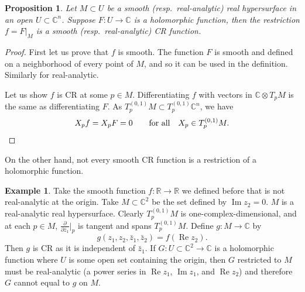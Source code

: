 \documentclass[12pt,openany]{book}
\renewcommand{\Re}{\operatorname{Re}}
\renewcommand{\Im}{\operatorname{Im}}
\newcommand{\C}{{\mathbb{C}}}
\newcommand{\R}{{\mathbb{R}}}
\theoremstyle{plain}
\newtheorem{prop}[thm]{Proposition}
\theoremstyle{remark}
\theoremstyle{definition}
\theoremstyle{exercise}
\theoremstyle{example}
\newtheorem{example}[thm]{Example}
\begin{document}
\begin{prop}
Let $M \subset U$ be a smooth (resp.\ real-analytic) real hypersurface in an
open $U
\subset \C^n$.  Suppose $F \colon U \to \C$ is a holomorphic function,
then the restriction $f = F|_M$ is a smooth (resp.\ real-analytic) CR function.
\end{prop}

\begin{proof}
First let us prove that $f$ is smooth.  The function $F$ is smooth and
defined on a neighborhood of every point of $M$, and so it can be used in the
definition.
Similarly for real-analytic.

Let us show $f$ is CR at some $p \in M$.
Differentiating $f$ with vectors in $\C \otimes
T_pM$ is the same as differentiating $F$.
As $T_p^{(0,1)} M \subset T_p^{(0,1)} \C^n$, we have
\begin{equation*}
X_p f = X_p F = 0 \qquad \text{for all} \quad X_p \in T_p^{(0,1)} M.
\qedhere
\end{equation*}
\end{proof}

On the other hand, not every smooth CR function is a restriction of a holomorphic function.

\begin{example}
Take the smooth function $f \colon \R \to \R$ we defined before
that is not real-analytic at the origin.
Take $M \subset \C^2$ be the set defined by $\Im z_2 = 0$.
$M$ is a
real-analytic real hypersurface.  Clearly
$T_p^{(0,1)} M$ is one-complex-dimensional, and at each $p \in M$,
$\frac{\partial}{\partial \bar{z}_1}\big|_p$ is tangent and spans
$T_p^{(0,1)} M$.  Define $g \colon M \to \C$ by
\begin{equation*}
g(z_1,z_2,\bar{z}_1,\bar{z}_2) = f(\Re z_2) .
\end{equation*}
Then $g$ is CR as it is independent of $\bar{z}_1$.
If $G \colon U \subset \C^2 \to \C$ is a holomorphic
function where $U$ is some open set containing the origin, then $G$
restricted to $M$ must be real-analytic (a power series in $\Re z_1$, $\Im
z_1$, and $\Re z_2$) and therefore $G$ cannot equal to
$g$ on $M$.
\end{example}
\end{document}
